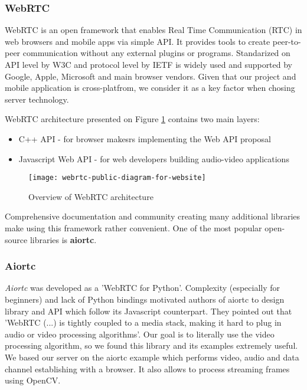 \documentclass[../Main.tex]{subfiles}
\begin{document}
    \subsubsection{WebRTC}
    WebRTC is an open framework that enables Real Time Communication (RTC) in web browsers and mobile apps via simple API. It provides tools to create peer-to-peer communication without any external plugins or programs. Standarized on API level by W3C 
    and protocol level by IETF 
    is widely used and supported by Google, Apple, Microsoft and main browser vendors. Given that our project and mobile application is cross-platfrom, we consider it as a key factor when chosing server technology.
    
    WebRTC architecture presented on  Figure \ref{fig:webrtc-public-diagram-for-website} contains two main layers: 
    \begin{itemize}
    \item C++ API - for browser makesrs implementing the Web API proposal
    \item Javascript Web API - for web developers building audio-video applications \\
    \end{itemize}
    
    \begin{figure}[h]
    \centering
    \texttt{[image: webrtc-public-diagram-for-website]}
    \caption{Overview of WebRTC architecture}
    \label{fig:webrtc-public-diagram-for-website}
    \end{figure}

    Comprehensive documentation and community creating many additional libraries make using this framework rather convenient. One of the most popular open-source libraries is \textbf{aiortc}.
    
    \subsubsection{Aiortc}
    \textit{Aiortc} was developed as a 'WebRTC for Python'. Complexity (especially for beginners) and lack of Python bindings motivated authors of aiortc to design library and API which follow its Javascript counterpart. They pointed out that 
    'WebRTC (...) is tightly coupled to a media stack, making it hard to plug in audio or video processing algorithms'. Our goal is to literally use the video processing algorithm, so we found this library and its examples extremely useful.
    We based our server on the aiortc example which performs video, audio and data channel establishing with a browser. It also allows to process streaming frames using OpenCV. 
    
\end{document}
